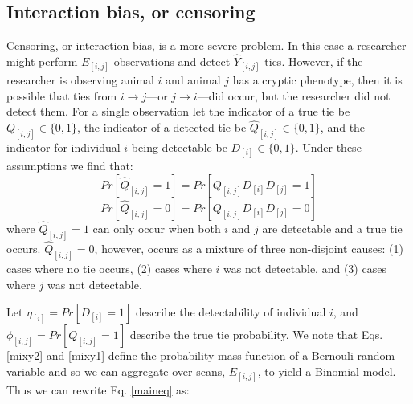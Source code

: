 \documentclass[Afour,sageh,times]{sagej}
\begin{document}
\subsection{Interaction bias, or censoring}
Censoring, or interaction bias, is a more severe problem. In this case a researcher might perform $E_{[i,j]}$ observations and detect $\hat Y_{[i,j]}$ ties. 
However, if the researcher is observing animal $i$ and animal $j$ has a cryptic phenotype, then it is possible that ties from $i \to j$---or $j \to i$---did occur, but the researcher did not detect them. For a single observation let the indicator of a true tie be $Q_{[i,j]} \in\{0,1\}$, the indicator of a detected tie be $\hat Q_{[i,j]}\in\{0,1\}$, and the indicator for individual $i$ being detectable be $D_{[i]}\in\{0,1\}$. Under these assumptions we find that:
  \begin{equation}\label{mixy2}
    Pr[\hat Q_{[i,j]}=1] = Pr[Q_{[i,j]}D_{[i]}D_{[j]}=1]
  \end{equation}
  \begin{equation}\label{mixy1}
    Pr[\hat Q_{[i,j]}=0] = Pr[Q_{[i,j]}D_{[i]}D_{[j]}=0]
  \end{equation}
where $\hat Q_{[i,j]}=1$ can only occur when both $i$ and $j$ are detectable and a true tie occurs. $\hat Q_{[i,j]}=0$, however, occurs as a mixture of three non-disjoint causes: (1) cases where no tie occurs, (2) cases where $i$ was not detectable, and (3) cases where $j$ was not detectable. 
  
Let $\eta_{[i]}=Pr[D_{[i]}=1]$ describe the detectability of individual $i$, and $\phi_{[i,j]}=Pr[Q_{[i,j]}=1]$ describe the true tie probability. We note that Eqs. \ref{mixy2} and \ref{mixy1} define the probability mass function of a Bernouli random variable and so we can aggregate over scans, $E_{[i,j]}$, to yield a Binomial model. Thus we can rewrite Eq. \ref{maineq} as:
\end{document}
